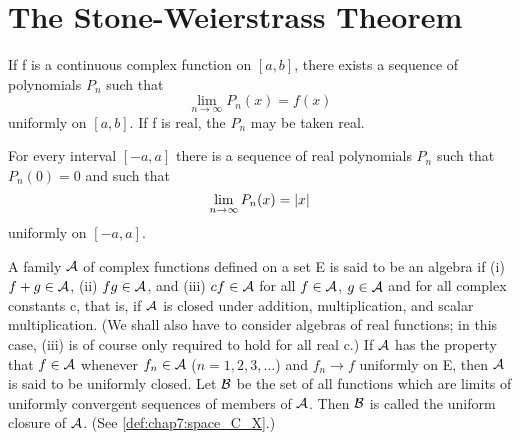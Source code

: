 

\section{The Stone-Weierstrass Theorem}
\label{sec:chap7:stone_weierstrass}

\begin{theorem} %
  \label{thm:chap7:weierstrass_approx}
  If f is a continuous complex function on $[a, b]$, there exists a
  sequence of polynomials $P_n$ such that
  \[ \lim_{n \to \infty} P_n(x) = f(x) \]
  uniformly on $[a, b]$. If f is real, the $P_n$ may be taken real.
\end{theorem}

\begin{corollary} %
  \label{cor:chap7:abs_x_poly_approx}
  For every interval $[-a, a]$ there is a sequence of real
  polynomials $P_n$ such that $P_n(0) = 0$ and such that
  \[ \lim_{n \to \infty} P_n(x) = \left\lvert x \right\rvert \]
  uniformly on $[-a, a]$.
\end{corollary}


\begin{definition} %
  \label{def:chap7:algebra_uniform_closure}
  A family $\mathcal{A}$ of complex functions defined on a set E
  is said to be an algebra if (i) $f+g \in \mathcal{A}$, (ii) $fg
  \in \mathcal{A}$, and (iii) $cf \in \mathcal{A}$ for all $f
  \in \mathcal{A}$, $g \in \mathcal{A}$ and for all complex
  constants c, that is, if $\mathcal{A}$ is closed under addition,
  multiplication, and scalar multiplication.
  (We shall also have to consider algebras of real functions; in this
  case, (iii) is of course only required to hold for all real c.)
  If $\mathcal{A}$ has the property that $f \in \mathcal{A}$
  whenever $f_n \in \mathcal{A}$ ($n=1, 2, 3, \dots$) and $f_n \to
  f$ uniformly on E, then $\mathcal{A}$ is said to be uniformly closed.
  Let $\mathcal{B}$ be the set of all functions which are limits
  of uniformly convergent sequences of members of $\mathcal{A}$.
  Then $\mathcal{B}$ is called the uniform closure of
  $\mathcal{A}$. (See \autoref{def:chap7:space_C_X}.)
\end{definition}


